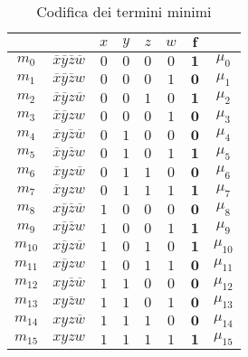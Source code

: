 \documentclass[a4paper]{extarticle}
\begin{document}
\begin{table}[H]
  \centering
  \noindent
  \begin{tabular}{c|c||cccc||c|c}
    $ $ & $ $ & $x$ & $y$ & $z$ & $w$ & $\boldsymbol{f}$\\
    \hline
    $m_0$ & $\overline{x}\overline{y}\overline{z}\overline{w}$ & $0$ & $0$ & $0$ & $0$ & $\boldsymbol{1}$ & $\mu_0$\\
    $m_1$ & $\overline{x}\overline{y}\overline{z}w$ & $0$ & $0$ & $0$ & $1$ & $\boldsymbol{0}$ & $\mu_1$\\
    $m_2$ & $\overline{x}\overline{y}z\overline{w}$ & $0$ & $0$ & $1$ & $0$ & $\boldsymbol{1}$ & $\mu_2$\\
    $m_3$ & $\overline{x}\overline{y}zw$ & $0$ & $0$ & $0$ & $1$ & $\boldsymbol{0}$ & $\mu_3$\\
    $m_4$ & $\overline{x}y\overline{z}\overline{w}$ & $0$ & $1$ & $0$ & $0$ & $\boldsymbol{0}$ & $\mu_4$\\
    $m_5$ & $\overline{x}y\overline{z}w$ & $0$ & $1$ & $0$ & $1$ & $\boldsymbol{1}$ & $\mu_5$\\
    $m_6$ & $\overline{x}yz\overline{w}$ & $0$ & $1$ & $1$ & $0$ & $\boldsymbol{0}$ & $\mu_6$\\
    $m_7$ & $\overline{x}yzw$ & $0$ & $1$ & $1$ & $1$ & $\boldsymbol{1}$ & $\mu_7$\\
    $m_8$ & $x\overline{y}\overline{z}\overline{w}$ & $1$ & $0$ & $0$ & $0$ & $\boldsymbol{0}$ & $\mu_8$\\
    $m_9$ & $x\overline{y}\overline{z}w$ & $1$ & $0$ & $0$ & $1$ & $\boldsymbol{1}$ & $\mu_9$\\
    $m_{10}$ & $x\overline{y}z\overline{w}$ & $1$ & $0$ & $1$ & $0$ & $\boldsymbol{1}$ & $\mu_{10}$\\
    $m_{11}$ & $x\overline{y}zw$ & $1$ & $0$ & $1$ & $1$ & $\boldsymbol{0}$ & $\mu_{11}$\\
    $m_{12}$ & $xy\overline{z}\overline{w}$ & $1$ & $1$ & $0$ & $0$ & $\boldsymbol{0}$ & $\mu_{12}$\\
    $m_{13}$ & $xy\overline{z}w$ & $1$ & $1$ & $0$ & $1$ & $\boldsymbol{0}$ & $\mu_{13}$\\
    $m_{14}$ & $xyz\overline{w}$ & $1$ & $1$ & $1$ & $0$ & $\boldsymbol{0}$ & $\mu_{14}$\\
    $m_{15}$ & $xyzw$ & $1$ & $1$ & $1$ & $1$ & $\boldsymbol{1}$ & $\mu_{15}$\\
  \end{tabular}
  \caption{Codifica dei termini minimi}
  \label{tab:codifica_termini_minimi}
\end{table}
\end{document}
